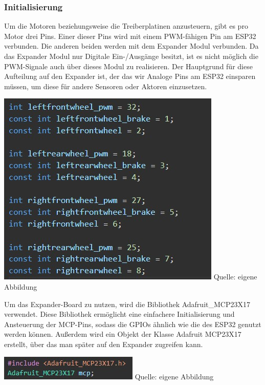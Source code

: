 \documentclass[ngerman,12pt,a4paper]{article}
\begin{document}
		\subsubsection{Initialisierung}
		Um die Motoren beziehungsweise die Treiberplatinen anzusteuern, gibt es pro Motor drei Pins. Einer dieser Pins wird mit einem PWM-fähigen Pin am ESP32 verbunden. Die anderen beiden werden mit dem Expander Modul verbunden. Da das Expander Modul nur Digitale Ein-/Ausgänge besitzt, ist es nicht möglich die PWM-Signale auch über dieses Modul zu realisieren. Der Hauptgrund für diese Aufteilung auf den Expander ist, der das wir Analoge Pins am ESP32 einsparen müssen, um diese für andere Sensoren oder Aktoren einzusetzen. \\[0.5cm]
		\begin{minipage}{\textwidth}
			\centering
			\includegraphics[scale=0.8]{Pictures/code_pins_motoren}
			\label{fig:code_pins_motoren}
			\vspace{-2pt}
			\small Quelle: eigene Abbildung
			\vspace{20pt}
		\end{minipage}
		Um das Expander-Board zu nutzen, wird die Bibliothek Adafruit\_MCP23X17 verwendet. Diese Bibliothek ermöglicht eine einfachere Initialisierung und Ansteuerung der MCP-Pins, sodass die GPIOs ähnlich wie die des ESP32 genutzt werden können. Außerdem wird ein Objekt der Klasse Adafruit MCP23X17 erstellt, über das man später auf den Expander zugreifen kann. \\[0.5cm]
		\begin{minipage}{\textwidth}
			\centering
			\includegraphics[scale=1.3]{Pictures/code_libary_motoren}
			\label{fig:code_libary_motoren}
			\vspace{-2pt}
			\small Quelle: eigene Abbildung
		\end{minipage}	
		\newpage
\end{document}
